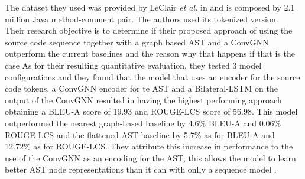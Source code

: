 The dataset they used was provided by LeClair \textit{et al.} in \cite{burstein2019proceedings} and 
is composed by 2.1 million Java method-comment pair. The authors used its tokenized version.\\
\newline
Their research objective is to determine if their proposed approach of using 
the source code sequence together with a graph based AST and a ConvGNN outperform
the current baselines and the reason why that happens if that is the case 
As for their resulting quantitative evaluation, they tested 3 model configurations and they found that the model 
that uses an encoder for the source code tokens, a ConvGNN encoder for te AST and a Bilateral-LSTM on the output 
of the ConvGNN resulted in having the highest performing approach obtaining a BLEU-A score of 19.93 
and ROUGE-LCS score of 56.98. This model outperformed the nearest graph-based baseline 
by 4.6\% BLEU-A and 0.06\% ROUGE-LCS and the flattened AST baseline by 5.7\% as for BLEU-A and 12.72\%
as for ROUGE-LCS. They attribute this increase in performance to the use of the 
ConvGNN as an encoding for the AST, this allows the model to learn better AST node representations than it can with 
onlly a sequence model \cite{Leclair2020}.

